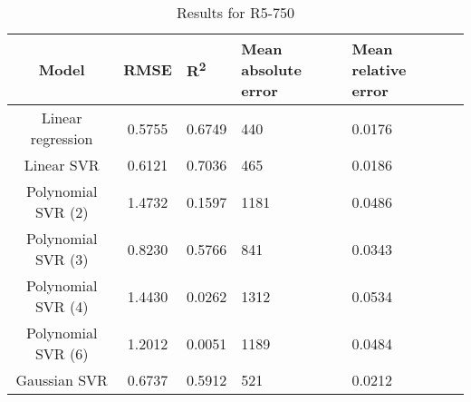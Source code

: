 \begin{table}[H]
\centering
\begin{adjustbox}{center}
\begin{tabular}{c | c M{1.2cm} M{2.5cm} M{2.5cm} M{1.8cm}}
Model & RMSE & R\textsuperscript{2} & Mean absolute error & Mean relative error \tabularnewline
\hline
Linear regression & 0.5755 & 0.6749 &    440 & 0.0176 \\
Linear SVR & 0.6121 & 0.7036 &    465 & 0.0186 \\
Polynomial SVR (2) & 1.4732 & 0.1597 &   1181 & 0.0486 \\
Polynomial SVR (3) & 0.8230 & 0.5766 &    841 & 0.0343 \\
Polynomial SVR (4) & 1.4430 & 0.0262 &   1312 & 0.0534 \\
Polynomial SVR (6) & 1.2012 & 0.0051 &   1189 & 0.0484 \\
Gaussian SVR & 0.6737 & 0.5912 &    521 & 0.0212 \\
\end{tabular}
\end{adjustbox}
\\
\caption{Results for R5-750}
\label{tab:coreonly_linear_R5_750}
\end{table}
